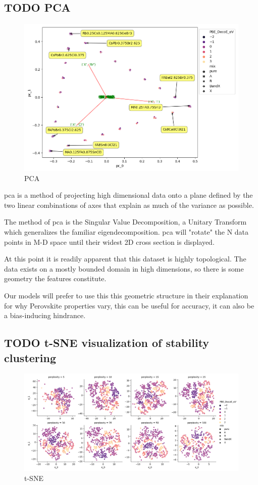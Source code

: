 \documentclass[twoside, twocolumn, 9pt, draft]{article}
\begin{document}
\subsection*{{\bfseries\sffamily TODO} PCA}
\label{sec:org991c7d7}
\begin{figure}
\centering
\includegraphics[width=.9\linewidth]{comp_ratio_projection_annot.png}
\caption{\label{fig:pca} PCA}
\end{figure}

\gls{pca} is a method of projecting high dimensional data onto
a plane defined by the two linear combinations of axes that explain as
much of the variance as possible.

The method of \gls{pca} is the Singular Value Decomposition, a
Unitary Transform which generalizes the familiar
eigendecomposition. \gls{pca} will "rotate" the N data points
in M-D space until their widest 2D cross section is displayed.

At this point it is readily apparent that this dataset is highly
topological. The data exists on a mostly bounded domain in high
dimensions, so there is some geometry the features constitute.

Our models will prefer to use this this geometric structure in their
explanation for why Perovskite properties vary, this can be useful for
accuracy, it can also be a bias-inducing hindrance.

\subsection*{{\bfseries\sffamily TODO} t-SNE visualization of stability clustering}
\label{sec:org4249079}
\begin{figure}
\centering
\includegraphics[width=.9\linewidth]{tsne_comp_DecoE_clusters.png}
\caption{\label{fig:tsne} t-SNE}
\end{figure}
\end{document}
